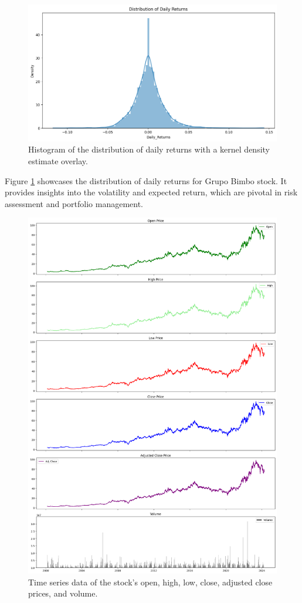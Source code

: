 \documentclass[conference]{IEEEtran}
\begin{document}
\begin{figure}[h!]
    \centering
    \includegraphics[scale=0.3]{stock_price_distribution.png}
    \caption{Histogram of the distribution of daily returns with a kernel density estimate overlay.}
    \label{fig:daily_returns}
\end{figure}

Figure \ref{fig:daily_returns} showcases the distribution of daily returns for Grupo Bimbo stock. It provides insights into the volatility and expected return, which are pivotal in risk assessment and portfolio management.

\begin{figure}[h!]
    \centering
    \includegraphics[scale=0.2]{stock_price.png}
    \caption{Time series data of the stock's open, high, low, close, adjusted close prices, and volume.}
    \label{fig:stock_price}
\end{figure}
\end{document}
